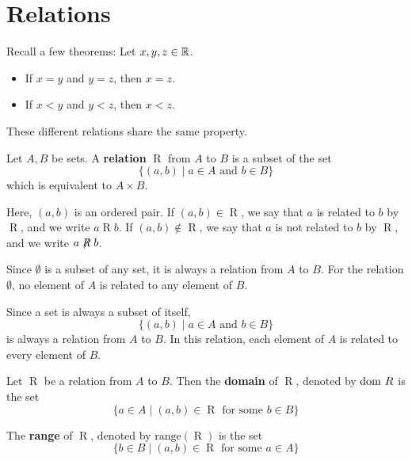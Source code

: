 \documentclass{article}
\begin{document}
\section{Relations}
\begin{remark}
  Recall a few theorems:
  Let $x, y, z \in \mathbb{R}$.
  \begin{itemize}
    \item If $x=y$ and $y=z$, then $x=z$.
    \item If $x < y$ and $y < z$, then $x < z$.
  \end{itemize}
  These different relations share the same property.
\end{remark}
\begin{definition}
  Let $A, B$ be sets. A \textbf{relation} $\mathrel{R}$ from $A$ to $B$ is a subset of the set
  \[
    \{(a, b) \mid a \in A \text{ and } b \in B \}
  \]
  which is equivalent to $A \times B$.

  Here, $(a, b)$ is an ordered pair.
  If $(a, b) \in \mathrel{R}$, we say that $a$ is related to $b$ by $\mathrel{R}$, and we write $a \mathrel{R} b$.
  If $(a, b) \not\in \mathrel{R}$, we say that $a$ is not related to $b$ by $\mathrel{R}$, and we write $a \not \mathrel{R} b$.

  Since $\emptyset$ is a subset of any set, it is always a relation from $A$ to $B$. For the relation $\emptyset$, no element of $A$ is related to any element of $B$.

  Since a set is always a subset of itself,
  \[
    \{(a, b) \mid a \in A \text{ and } b \in B\}
  \]
  is always a relation from $A$ to $B$. In this relation, each element of $A$ is related to every element of $B$.
\end{definition}

\begin{definition}
  Let $\mathrel{R}$ be a relation from $A$ to $B$. Then the \textbf{domain} of $\mathrel{R}$, denoted by $\text{dom }{R}$ is the set
  \[
    \{a \in A \mid (a,b) \in \mathrel{R} \text{ for some $b \in B$}\}
  \]

  The \textbf{range} of $\mathrel{R}$, denoted by $\text{range}(\mathrel{R})$ is the set
  \[
    \{b \in B \mid (a,b) \in \mathrel{R} \text{ for some $a \in A$}\}
  \]
\end{definition}
\end{document}
